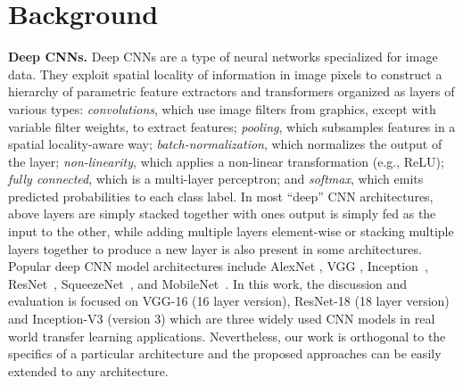 \section{Background}

\vspace{2mm}
\noindent \textbf{Deep CNNs.} Deep CNNs are a type of neural networks specialized for image data.
They exploit spatial locality of information in image pixels to construct a hierarchy of parametric feature extractors and transformers organized as layers of various types: \textit{convolutions}, which use image
filters from graphics, except with variable filter weights, to extract features; \textit{pooling}, which subsamples features in a spatial
locality-aware way; \textit{batch-normalization}, which normalizes the output of the layer; \textit{non-linearity}, which applies a non-linear transformation (e.g., ReLU); \textit{fully connected}, which is a multi-layer perceptron; and \textit{softmax}, which emits predicted probabilities to each class label.
In most ``deep'' CNN architectures, above layers are simply stacked together with ones output is simply fed as the input to the other, while adding multiple layers element-wise or stacking multiple layers together to produce a new layer is also present in some architectures.
Popular deep CNN model architectures include AlexNet \cite{alexnet}, VGG \cite{vggnet}, Inception~\cite{inception}, ResNet~\cite{resnet}, SqueezeNet~\cite{squeezenet}, and MobileNet~\cite{mobilenets}.
In this work, the discussion and evaluation is focused on VGG-16 (16 layer version), ResNet-18 (18 layer version) and Inception-V3 (version 3) which are three widely used CNN models in real world transfer learning applications.
Nevertheless, our work is orthogonal to the specifics of a particular architecture and the proposed approaches can be easily extended to any architecture.

